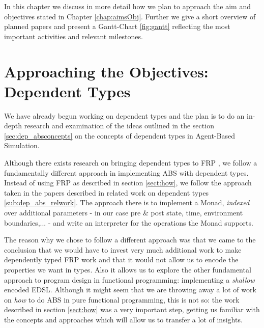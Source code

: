 
In this chapter we discuss in more detail how we plan to approach the aim and objectives stated in Chapter \ref{chap:aimsObj}. Further we give a short overview of planned papers and present a Gantt-Chart \ref{fig:gantt} reflecting the most important activities and relevant milestones.

\section{Approaching the Objectives: Dependent Types}
We have already begun working on dependent types and the plan is to do an in-depth research and examination of the ideas outlined in the section \ref{sec:dep_absconcepts} on the concepts of dependent types in Agent-Based Simulation.

Although there exists research on bringing dependent types to FRP \cite{sculthorpe_safe_2009}, we follow a fundamentally different approach in implementing ABS with dependent types. Instead of using FRP as described in section \ref{sect:how}, we follow the approach taken in the papers described in related work on dependent types \ref{sub:dep_abs_relwork}. The approach there is to implement a Monad, \textit{indexed} over additional parameters - in our case pre \& post state, time, environment boundaries,... - and write an interpreter for the operations the Monad supports.

The reason why we chose to follow a different approach was that we came to the conclusion that we would have to invest very much additional work to make dependently typed FRP work and that it would not allow us to encode the properties we want in types. Also it allows us to explore the other fundamental approach to program design in functional programming: implementing a \textit{shallow} encoded EDSL. Although it might seem that we are throwing away a lot of work on \textit{how} to do ABS in pure functional programming, this is not so: the work described in section \ref{sect:how} was a very important step, getting us familiar with the concepts and approaches which will allow us to transfer a lot of insights. %

